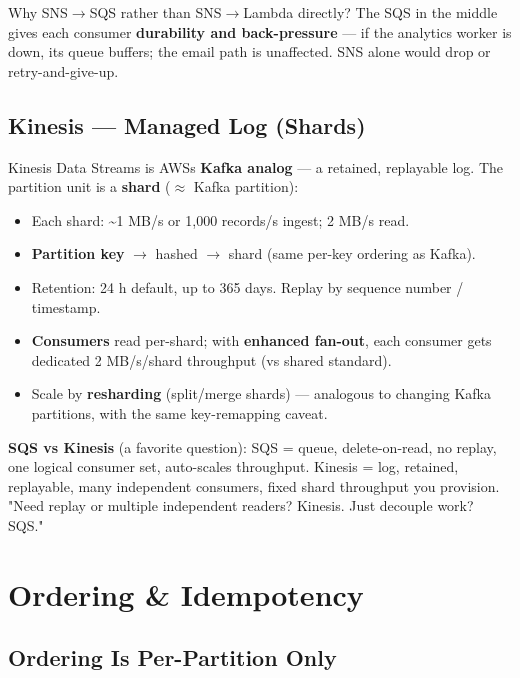 \documentclass[11pt]{article}
\providecommand{\tightlist}{\setlength{\itemsep}{1pt}\setlength{\parskip}{0pt}}
\begin{document}
Why SNS\(\rightarrow\)SQS rather than SNS\(\rightarrow\)Lambda directly? The SQS in the middle gives each consumer \textbf{durability and back-pressure} --- if the analytics worker is down, its queue buffers; the email path is unaffected. SNS alone would drop or retry-and-give-up.

\subsection{Kinesis --- Managed Log (Shards)}\label{kinesis--managed-log-shards}

Kinesis Data Streams is AWS\textquotesingle s \textbf{Kafka analog} --- a retained, replayable log. The partition unit is a \textbf{shard} (\(\approx\) Kafka partition):

\begin{itemize}
\tightlist
\item
  Each shard: \textasciitilde1 MB/s or 1,000 records/s ingest; 2 MB/s read.
\item
  \textbf{Partition key} \(\rightarrow\) hashed \(\rightarrow\) shard (same per-key ordering as Kafka).
\item
  Retention: 24 h default, up to 365 days. Replay by sequence number / timestamp.
\item
  \textbf{Consumers} read per-shard; with \textbf{enhanced fan-out}, each consumer gets dedicated 2 MB/s/shard throughput (vs shared standard).
\item
  Scale by \textbf{resharding} (split/merge shards) --- analogous to changing Kafka partitions, with the same key-remapping caveat.
\end{itemize}

\textbf{SQS vs Kinesis} (a favorite question): SQS = queue, delete-on-read, no replay, one logical consumer set, auto-scales throughput. Kinesis = log, retained, replayable, many independent consumers, fixed shard throughput you provision. "Need replay or multiple independent readers? Kinesis. Just decouple work? SQS."

\section{Ordering \& Idempotency}\label{ordering--idempotency}

\subsection{Ordering Is Per-Partition Only}\label{ordering-is-per-partition-only}
\end{document}
